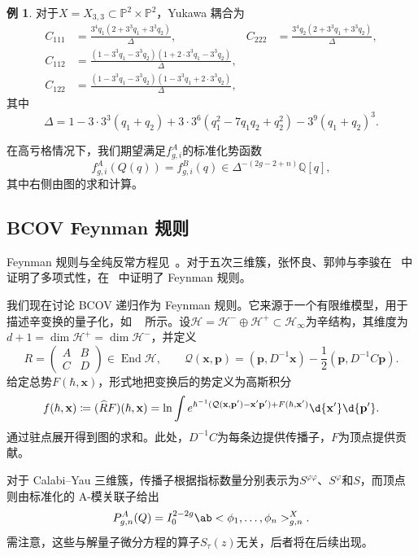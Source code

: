 \documentclass{amsart}
\theoremstyle{definition}
\newtheorem{exm}[thm]{例}
\theoremstyle{remark}
\theoremstyle{plain}
\theoremstyle{definition}
\theoremstyle{remark}
\newcommand{\Q}{\mathbb{Q}}
\renewcommand{\P}{\mathbb{P}}
\newcommand{\mc}[1]{\mathcal{#1}}
\newcommand{\mbf}[1]{\mathbf{#1}}
\newcommand{\bp}{\mbf{p}}
\newcommand{\wh}[1]{\widehat{#1}}
\newcommand{\1}{\mathbf{1}}
\newcommand{\2}{\mathbf{2}}
\newcommand{\3}{\mathbf{3}}
\DeclareMathOperator{\End}{End}
\begin{document}
\begin{exm}
对于\(X = X_{3,3} \subset \P^2 \times \P^2\)，Yukawa 耦合为
    \begin{align*}
        C_{111} &= \frac{3^4 q_1 (2+3^3q_1+3^3q_2)}{\Delta}, & C_{222} &= \frac{3^4 q_2(2+3^3q_1+3^3q_2)}{\Delta}, \\
        C_{112} &= \frac{(1-3^3q_1-3^3q_2)(1+2\cdot 3^3 q_1 - 3^3 q_2)}{\Delta}, \\
        C_{122} &= \frac{(1-3^3q_1-3^3q_2)(1-3^3q_1+2\cdot3^3q_2)}{\Delta},
    \end{align*}
其中
    \[ \Delta = 1 - 3\cdot3^3(q_1+q_2) + 3\cdot3^6(q_1^2 - 7q_1q_2+q_2^2) - 3^9(q_1+q_2)^3. \]
\end{exm}

在高亏格情况下，我们期望满足\(f^A_{g,i}\)的标准化势函数
\[ f^A_{g,i}(Q(q)) = f^B_{g,i}(q) \in \Delta^{-(2g-2+n)}\Q[q], \]
其中右侧由图的求和计算。

\subsection{BCOV Feynman 规则}%
\label{sub:The BCOV Feynman rule}

Feynman 规则与全纯反常方程见~\cite{BCOV1994}。对于五次三维簇，张怀良、郭帅与李骏在~\cite{CGL2021} 中证明了多项式性，在~\cite{CGL2026} 中证明了 Feynman 规则。

我们现在讨论 BCOV 递归作为 Feynman 规则。它来源于一个有限维模型，用于描述辛变换的量子化，如 ~ 所示。设\(\mc{H} = \mc{H}^- \oplus \mc{H}^+ \subset \mc{H}_{\infty}\)为辛结构，其维度为\(d+1 = \dim \mc{H}^+ = \dim \mc{H}^-\)，并定义
\[ R = \begin{pmatrix} A & B \\ C & D \end{pmatrix} \in \End \mc{H}, \qquad \mc{Q}(\mbf{x},\bp) = (\bp, D^{-1}\mbf{x}) - \frac{1}{2}(\bp, D^{-1}C\bp). \]
给定总势\(F(\hbar, \mbf{x})\)，形式地把变换后的势定义为高斯积分
\[ f(\hbar, \mbf{x}) \coloneqq (\wh{R}F)(\hbar,\mbf{x}) = \ln \int e^{\hbar^{-1}(\mc{Q}(\mbf{x},\bp') - \mbf{x}'\bp') + F(\hbar,\mbf{x}')}\d{\mbf{x}'}\d{\bp'}. \]
通过驻点展开得到图的求和。此处，\(D^{-1}C\)为每条边提供传播子，\(F\)为顶点提供贡献。

对于 Calabi--Yau 三维簇，传播子根据指标数量分别表示为\(S^{\varphi\varphi}\)、\(S^{\varphi}\)和\(S\)，而顶点则由标准化的 A-模关联子给出
\[ P^A_{g,n}(Q) = I_0^{2-2g}\ab<\phi_1, \ldots, \phi_n>^X_{g,n}. \]
需注意，这些与解量子微分方程的算子\(S_{\tau}(z)\)无关，后者将在后续出现。
\end{document}
